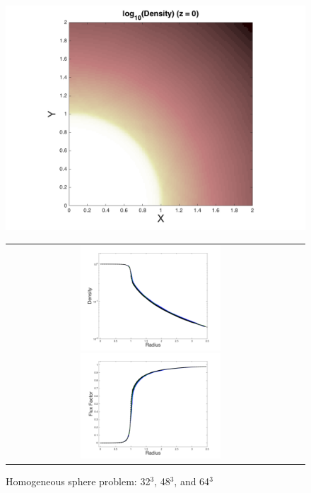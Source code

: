 \begin{figure}[h]
  \centering
  \includegraphics[width=1.0\textwidth]{figures/HomogeneousSphere_Resolution_3}
  \begin{tabular}{cc}
    \includegraphics[width=0.5\textwidth]{figures/HomogeneousSphere_Resolution_1}
    \includegraphics[width=0.5\textwidth]{figures/HomogeneousSphere_Resolution_2}
  \end{tabular}
   \caption{Homogeneous sphere problem: 32$^{3}$, 48$^{3}$, and 64$^{3}$}
  \label{fig:HomogeneousSphere_Resolution}
\end{figure}